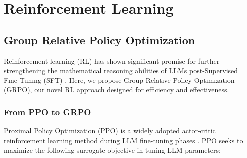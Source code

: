 \section{Reinforcement Learning}

\subsection{Group Relative Policy Optimization} Reinforcement learning (RL) has shown significant promise for further strengthening the mathematical reasoning abilities of LLMs post-Supervised Fine-Tuning (SFT) \citep{wang2023math,wizardmath}. Here, we propose Group Relative Policy Optimization (GRPO), our novel RL approach designed for efficiency and effectiveness.

\subsubsection{From PPO to GRPO} Proximal Policy Optimization (PPO) \citep{schulman2017proximal} is a widely adopted actor-critic reinforcement learning method during LLM fine-tuning phases \citep{ouyang2022training}. PPO seeks to maximize the following surrogate objective in tuning LLM parameters:

